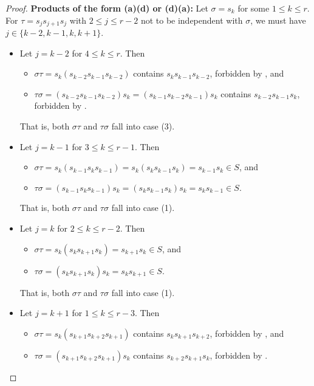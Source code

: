 \documentclass{amsart}
\theoremstyle{definition}
\begin{document}
\begin{appendices}
\begin{proof}
    
\smallskip

\noindent \textbf{Products of the form (a)(d) or (d)(a):}
    Let $\sigma=s_k$ for some $1\leq k\leq r$. For $\tau=s_js_{j+1}s_j$ with $2\leq j\leq r-2$ not to be independent with $\sigma$, we must have $j\in\{k-2, k-1, k, k+1\}$.
    \begin{itemize}
        \item Let $j=k-2$ for $4\leq k\leq r$. Then \begin{itemize}
            \item $\sigma\tau=s_k(s_{k-2}s_{k-1}s_{k-2})$ contains $s_ks_{k-1}s_{k-2}$, forbidden by , and
            \item $\tau\sigma=(s_{k-2}s_{k-1}s_{k-2})s_k=(s_{k-1}s_{k-2}s_{k-1})s_k$
            contains $s_{k-2}s_{k-1}s_k$, forbidden by .
        \end{itemize}
        That is, both $\sigma\tau$ and $\tau\sigma$ fall into case (3).
        \item Let $j=k-1$ for $3\leq k\leq r-1$. Then \begin{itemize}
            \item $\sigma\tau=s_k(s_{k-1}s_ks_{k-1})=s_k(s_ks_{k-1}s_k)=s_{k-1}s_k\in S$, and
            \item $\tau\sigma=(s_{k-1}s_ks_{k-1})s_k=(s_ks_{k-1}s_k)s_k=s_ks_{k-1}\in S$.
        \end{itemize}
        That is, both $\sigma\tau$ and $\tau\sigma$ fall into case (1).
        \item Let $j=k$ for $2\leq k\leq r-2$. Then \begin{itemize}
            \item $\sigma\tau=s_k(s_ks_{k+1}s_k)=s_{k+1}s_k\in S$, and
            \item $\tau\sigma=(s_ks_{k+1}s_k)s_k=s_ks_{k+1}\in S$.
        \end{itemize}
        That is, both $\sigma\tau$ and $\tau\sigma$ fall into case (1).
        \item Let $j=k+1$ for $1\leq k\leq r-3$. Then \begin{itemize}
            \item $\sigma\tau=s_k(s_{k+1}s_{k+2}s_{k+1})$ contains $s_ks_{k+1}s_{k+2}$, forbidden by , and
            \item $\tau\sigma=(s_{k+1}s_{k+2}s_{k+1})s_k$ contains $s_{k+2}s_{k+1}s_k$, forbidden by .
        \end{itemize}

\end{itemize}
\end{proof}
\end{appendices}
\end{document}
